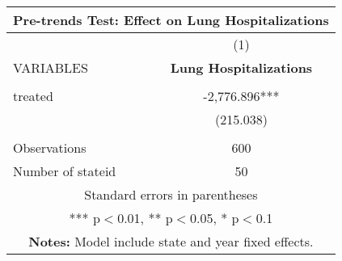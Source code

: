 \documentclass[]{article}
\begin{document}
\begin{tabular}{lc}
\multicolumn{2}{c}{\textbf{Pre-trends Test: Effect on Lung Hospitalizations}} \\ \hline
 & (1) \\
VARIABLES & \textbf{Lung Hospitalizations} \\ \hline
 &  \\
treated & -2,776.896*** \\
 & (215.038) \\
 &  \\
Observations & 600 \\
 Number of stateid & 50 \\ \hline
\multicolumn{2}{c}{ Standard errors in parentheses} \\
\multicolumn{2}{c}{ *** p$<$0.01, ** p$<$0.05, * p$<$0.1} \\
\multicolumn{2}{c}{ \textbf{Notes:} Model include state and year fixed effects.} \\
\end{tabular}
\end{document}
